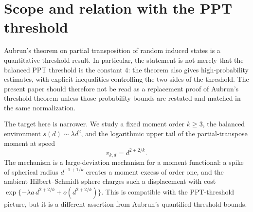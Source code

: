 \documentclass[11pt,reqno]{amsart}
\newenvironment{revnewmath}{\begingroup\color{RevisionNewMath}}{\endgroup}
\begin{document}
\begin{revnewmath}
\section{Scope and relation with the PPT threshold}
\label{sec:scope-aubrun}

Aubrun's theorem on partial transposition of random induced states is a
quantitative threshold result.  In particular, the statement is not merely
that the balanced PPT threshold is the constant \(4\): the theorem also gives
high-probability estimates, with explicit inequalities controlling the two
sides of the threshold.  The present paper should therefore not be read as a
replacement proof of Aubrun's threshold theorem unless those probability
bounds are restated and matched in the same normalization.

The target here is narrower.  We study a fixed moment order \(k\ge3\), the
balanced environment \(s(d)\sim\lambda d^2\), and the logarithmic upper tail
of the partial-transpose moment at speed
\[
  v_{k,d}=d^{2+2/k}.
\]
The mechanism is a large-deviation mechanism for a moment functional: a spike
of spherical radius \(d^{-1+1/k}\) creates a moment excess of order one, and
the ambient Hilbert--Schmidt sphere charges such a displacement with cost
\(\exp\{-\lambda a\,d^{2+2/k}+o(d^{2+2/k})\}\).  This is compatible with the
PPT-threshold picture, but it is a different assertion from Aubrun's
quantified threshold bounds.
\end{revnewmath}
\end{document}

